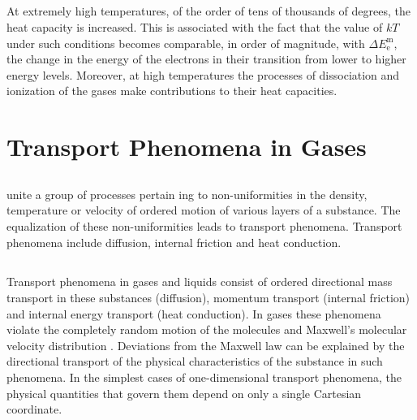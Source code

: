 \subsection{}\label{10.7.6} At extremely high temperatures, of the order of tens of thousands of degrees, the heat capacity is increased. This is associated with the fact that the value of $kT$ under such conditions becomes comparable, in order of magnitude, with $\Delta E_{\text{e}}^{\text{m}}$, the change in the energy of the electrons in their transition from lower to higher energy levels. Moreover, at high tem­peratures the processes of dissociation and ionization of the gases make contributions to their heat capacities.

\section{Transport Phenomena in Gases}
\label{sec-10.8}

\subsection{}\label{10.8.1}  unite a group of processes pertain­ ing to non-uniformities in the density, temperature or velocity of ordered motion of various layers of a substance. The equalization of these non-uniformities leads to transport phenomena. Transport phenomena include diffusion, internal friction and heat conduction.

\subsection{}\label{10.8.2} Transport phenomena in gases and liquids consist of ordered directional mass transport in these substances (diffusion), momentum transport (internal friction) and internal energy transport (heat conduction). In gases these phenomena violate the completely random motion of the molecules and Maxwell's molecular velocity distribution . Deviations from the Maxwell law can be explained by the directional transport of the physical characteristics of the substance in such phenomena. In the simplest cases of one-dimensional transport phenomena, the physical quantities that govern them depend on only a single Cartesian coordinate.

